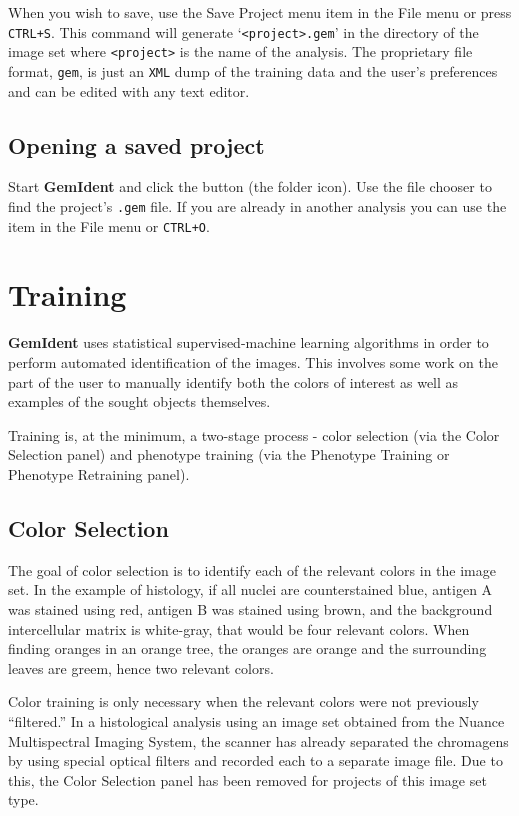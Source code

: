 \documentclass[12pt]{article}
\begin{document}
When you wish to save, use the {\sf  Save Project} menu item in the {\sf File} menu or press {\tt CTRL+S}. This command will generate `{\tt <project>.gem}' in the directory of the image set where {\tt <project>} is the name of the analysis. The proprietary file format, {\tt gem}, is just an {\tt XML} dump of the training data and the user's preferences and can be edited with any text editor.

\subsection{Opening a saved project\label{open}}

Start {\bf GemIdent} and click the  button (the folder icon). Use the file chooser to find the project's {\tt .gem} file. If you are already in another analysis you can use the  item in the {\sf File} menu or {\tt CTRL+O}.

\section{Training\label{training}}

{\bf GemIdent} uses statistical supervised-machine learning algorithms in order to perform automated identification of the images. This involves some work on the part of the user to manually identify both the colors of interest as well as examples of the sought objects themselves.

Training is, at the minimum, a two-stage process - color selection (via the {\sf  Color Selection} panel) and phenotype training (via the {\sf  Phenotype Training} or {\sf  Phenotype Retraining} panel). 

\subsection{Color Selection\label{color_selection}}

The goal of color selection is to identify each of the relevant colors in the image set. In the example of histology, if all nuclei are counterstained blue, antigen A was stained using red, antigen B was stained using brown, and the background intercellular matrix is white-gray, that would be four relevant colors. When finding oranges in an orange tree, the oranges are orange and the surrounding leaves are greem, hence two relevant colors.

Color training is only necessary when the relevant colors were not previously ``filtered.'' In a histological analysis using an image set obtained from the Nuance Multispectral Imaging System, the scanner has already separated the chromagens by using special optical filters and recorded each to a separate image file. Due to this, the {\sf  Color Selection} panel has been removed for projects of this image set type.
\end{document}

